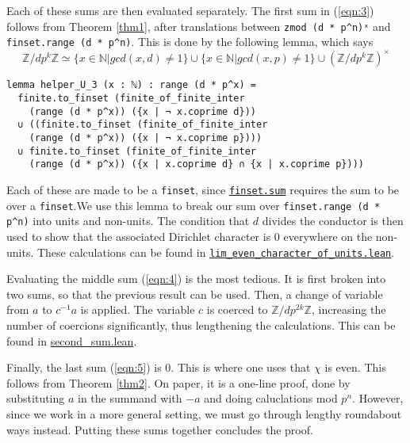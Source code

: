 \documentclass[a4paper,UKenglish,cleveref, autoref, thm-restate]{lipics-v2021}
\newcommand{\lean}[1]{\texttt{#1}\xspace} %
\begin{document}
Each of these sums are then evaluated separately. The first sum in (\ref{eqn:3}) follows from Theorem \ref{thm1}, after translations between \lean{zmod (d * p\textasciicircum n)ˣ} and \lean{finset.range (d * p\textasciicircum n)}. 
This is done by the following lemma, which says 
$$ \mathbb{Z} / d p^k \mathbb{Z} \simeq \{ x \in \mathbb{N} | gcd (x, d) \ne 1 \} \cup \{ x \in \mathbb{N} | gcd (x, p) \ne 1 \} 
\cup (\mathbb{Z} / d p^k \mathbb{Z})^{\times} $$ 
\begin{lstlisting}
lemma helper_U_3 (x : ℕ) : range (d * p^x) = 
  finite.to_finset (finite_of_finite_inter 
    (range (d * p^x)) ({x | ¬ x.coprime d})) 
  ∪ ((finite.to_finset (finite_of_finite_inter 
    (range (d * p^x)) ({x | ¬ x.coprime p}))) 
  ∪ finite.to_finset (finite_of_finite_inter 
    (range (d * p^x)) ({x | x.coprime d} ∩ {x | x.coprime p}))) 
\end{lstlisting}
Each of these are made to be a \lean{finset}, since \href{https://leanprover-community.github.io/mathlib_docs/algebra/big_operators/basic.html#finset.sum}{\lean{finset.sum}} 
requires the sum to be over a \lean{finset}.We use this lemma to break our sum over \lean{finset.range (d * p\textasciicircum n)} into units and non-units. 
The condition that $d$ divides the conductor is then used to show that the associated Dirichlet character is 0 everywhere on the non-units. 
These calculations can be found in \href{https://github.com/laughinggas/p-adic-L-functions/blob/main/src/general_bernoulli_number/lim_even_character_of_units.lean}{\lean{lim\_even\_character\_of\_units.lean}}.

Evaluating the middle sum (\ref{eqn:4}) is the most tedious. It is first broken into two sums, so that the previous result can be used. Then, a 
change of variable from $a$ to $c^{-1} a$ is applied. The variable $c$ is coerced to $\mathbb{Z}/ d p^{2k} \mathbb{Z}$, increasing 
the number of coercions significantly, thus lengthening the calculations. This can be found in \href{https://github.com/laughinggas/p-adic-L-functions/blob/main/src/sum_eval/second_sum.lean}{second\_sum.lean}.

Finally, the last sum (\ref{eqn:5}) is 0. This is where one uses that $\chi$ is even. This follows from Theorem \ref{thm2}. 
On paper, it is a one-line proof, done by substituting $a$ in the summand with $-a$ and doing caluclations mod $p^n$. However, since we work in a more general setting, 
we must go through lengthy roundabout ways instead. 
\newline Putting these sums together concludes the proof.
\end{document}
